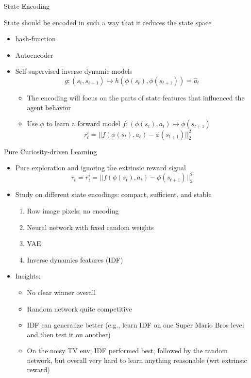 \documentclass[aspectratio=169]{../latex_main/tntbeamer}  %
\begin{document}
\begin{frame}[c]{State Encoding}
	

	State should be encoded in such a way that it reduces the state space
	\begin{itemize}
		\item hash-function~
		\item Autoencoder~
		\item Self-supervised inverse dynamic models~
		$$g: (s_t, s_{t+1}) \mapsto h(\phi(s_t), \phi(s_{t+1})) = \hat{a}_t $$
		\begin{itemize}
			\item The encoding will focus on the parts of state features that influenced the agent behavior
			\item Use $\phi$ to learn a forward model $f: (\phi(s_t), a_t) \mapsto \phi(s_{t+1})$
			$$ r_t^i = || f(\phi(s_{t}), a_t) - \phi(s_{t+1})||^2_2$$
		\end{itemize}
	\end{itemize}
	
	
\end{frame}
\begin{frame}[c]{Pure Curiosity-driven Learning~}
	
	\begin{itemize}
		\item Pure exploration and ignoring the extrinsic reward signal
		$$r_t  = r_t^i = ||f(\phi(s_t), a_t) - \phi(s_{t+1}) ||_2^2 $$
		\item Study on different state encodings: compact, sufficient, and stable
		\begin{enumerate}
			\item Raw image pixels; no encoding
			\item Neural network with fixed random weights
			\item VAE
			\item Inverse dynamics features (IDF)
		\end{enumerate}
		\item Insights:
		\begin{itemize}
			\item No clear winner overall
			\item Random network quite competitive
			\item IDF can generalize better (e.g., learn IDF on one Super Mario Bros level and then test it on another)
			\item On the noisy TV env, IDF performed best, followed by the random network, but overall very hard to learn anything reasonable (wrt extrinsic reward)
		\end{itemize}
	\end{itemize}
	
	
\end{frame}
\end{document}
